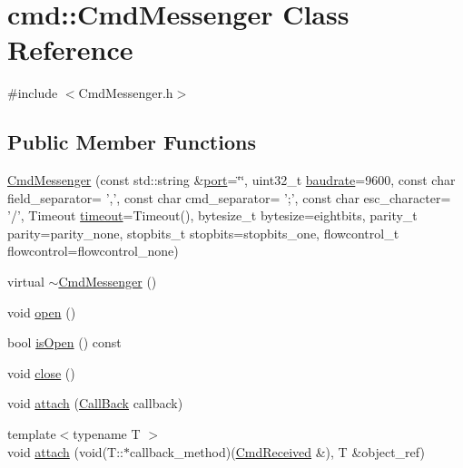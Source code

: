 \hypertarget{classcmd_1_1_cmd_messenger}{\section{cmd\+:\+:Cmd\+Messenger Class Reference}
\label{classcmd_1_1_cmd_messenger}
}


{\ttfamily \#include $<$Cmd\+Messenger.\+h$>$}

\subsection*{Public Member Functions}
\begin{DoxyCompactItemize}
\item 
\hyperlink{classcmd_1_1_cmd_messenger_aba80ae7cc283a24b7afa08c18f89af0f}{Cmd\+Messenger} (const std\+::string \&\hyperlink{interbyte_8cpp_aae3ba4688e12d52dca80a55b5725b29d}{port}=\char`\"{}\char`\"{}, uint32\+\_\+t \hyperlink{interbyte_8cpp_ac4f06ea26ed6bd7ae83b92d64ac10b78}{baudrate}=9600, const char field\+\_\+separator= ',', const char cmd\+\_\+separator= ';', const char esc\+\_\+character= '/', Timeout \hyperlink{interbyte_8cpp_ab5627d8d8b095c198e2523c44ca380ac}{timeout}=Timeout(), bytesize\+\_\+t bytesize=eightbits, parity\+\_\+t parity=parity\+\_\+none, stopbits\+\_\+t stopbits=stopbits\+\_\+one, flowcontrol\+\_\+t flowcontrol=flowcontrol\+\_\+none)
\item 
virtual \hyperlink{classcmd_1_1_cmd_messenger_aa92b483212121faffeb02b7a63450ad0}{$\sim$\+Cmd\+Messenger} ()
\item 
void \hyperlink{classcmd_1_1_cmd_messenger_adb4617437e81ccb39b1d314b83db8f6c}{open} ()
\item 
bool \hyperlink{classcmd_1_1_cmd_messenger_a38dab46f4b3c0c56e8dad6e91b9500c8}{is\+Open} () const 
\item 
void \hyperlink{classcmd_1_1_cmd_messenger_a3a08819cae57dd6c9f7515ebae923696}{close} ()
\item 
void \hyperlink{classcmd_1_1_cmd_messenger_a92df6db7de8ce3d685d4da21b7c76d77}{attach} (\hyperlink{namespacecmd_a20b40ecd3ba46130eef6c125f70c4121}{Call\+Back} callback)
\item 
{\footnotesize template$<$typename T $>$ }\\void \hyperlink{classcmd_1_1_cmd_messenger_a5af33d07f7074623701f822a6cb7ee81}{attach} (void(T\+::$\ast$callback\+\_\+method)(\hyperlink{classcmd_1_1_cmd_received}{Cmd\+Received} \&), T \&object\+\_\+ref)
\item 

\end{DoxyCompactItemize}
